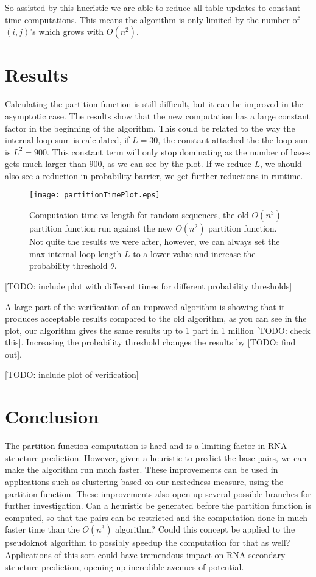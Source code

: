 So assisted by this hueristic we are able to reduce all table updates
to constant time computations. This means the algorithm is only
limited by the number of $(i,j)$'s which grows with $O(n^2)$. 

\section{Results}

Calculating the partition function is still difficult, but it can be
improved in the asymptotic case. The results show that the new
computation has a large constant factor in the beginning of the
algorithm. This could be related to the way the internal loop sum is
calculated, if $L=30$, the constant attached the the loop sum is
$L^2=900$. This constant term will only stop dominating as the number
of bases gets much larger than 900, as we can see by the plot. If we
reduce $L$, we should also see a reduction in  probability barrier, we
get further reductions in runtime.

\begin{figure}
\centering
\texttt{[image: partitionTimePlot.eps]} 
\caption{Computation time vs length for random sequences, the old
  $O(n^3)$ partition function run against the new $O(n^2)$ partition
  function. Not quite the results we were after, however, we can
  always set the max internal loop length $L$ to a lower value and
  increase the probability threshold $\theta$.}
\label{fig:pfResults}
\end{figure}

[TODO: include plot with different times for different probability
thresholds]

A large part of the verification of an improved algorithm is showing
that it produces acceptable results compared to the old algorithm, as
you can see in the plot, our algorithm gives the same results up to 1
part in 1 million [TODO: check this]. Increasing the probability
threshold changes the results by [TODO: find out].

[TODO: include plot of verification]

\section{Conclusion}

The partition function computation is hard and is a limiting factor in
RNA structure prediction. However, given a heuristic to predict the
base pairs, we can make the algorithm run much faster. These
improvements can be used in applications such as clustering based on
our nestedness measure, using the partition function. These
improvements also open up several possible branches for further
investigation. Can a heuristic be generated before the partition
function is computed, so that the pairs can be restricted and the
computation done in much faster time than the $O(n^3)$ algorithm?
Could this concept be applied to the pseudoknot algorithm to possibly
speedup the computation for that as well? Applications of this sort
could have tremendous impact on RNA secondary structure prediction,
opening up incredible avenues of potential.

